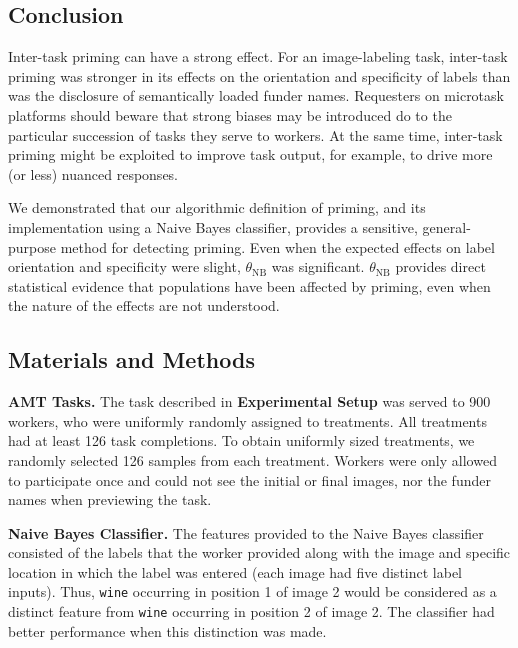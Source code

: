 \documentclass[a4paper]{report}
\begin{document}
\subsection*{Conclusion}
Inter-task priming can have a strong effect.  
For an image-labeling task, inter-task priming was stronger in its effects on 
the orientation and specificity of labels than was the disclosure of 
semantically loaded funder names.  Requesters on microtask platforms should 
beware that strong biases may be introduced do to the particular succession
of tasks they serve to workers.
At the 
same time, inter-task priming might be exploited to improve task output, for 
example, to drive more (or less) nuanced responses.

We demonstrated that our algorithmic definition of priming, and its 
implementation using a Naive Bayes classifier, provides a sensitive,
general-purpose method for detecting priming.  Even when the expected effects 
on label orientation and specificity were slight, $\theta_\text{NB}$ 
was significant.  $\theta_\text{NB}$ provides direct statistical evidence that 
populations have been affected by priming, even when the nature of the 
effects are not understood. 

\subsection*{Materials and Methods}

\textbf{AMT Tasks.} The task described in \textbf{Experimental Setup}
was served to 900 workers, who were uniformly randomly assigned to
treatments.  All treatments had at least 126 task completions.  To obtain 
uniformly sized treatments, we randomly selected 126 samples from each 
treatment. Workers were
only allowed to participate once and could not see the initial or final 
images, nor the funder names when previewing the task.

\textbf{Naive Bayes Classifier.}
The features provided to the Naive Bayes classifier consisted of the labels
that the worker provided along with the image and specific location in which 
the label was entered
(each image had five distinct label inputs).  Thus, \texttt{wine} occurring in 
position 1 of image 2 would be considered as a distinct feature from 
\texttt{wine} occurring in position 2 of image 2. The classifier 
had better performance when this distinction was made.
\end{document}
